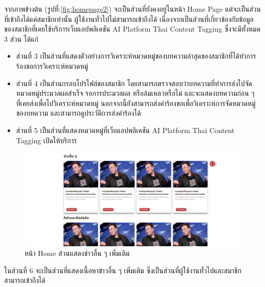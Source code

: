 \documentclass[12pt,oneside,openright,a4paper]{cpe-thai-project}
\begin{document}
\hspace*{1cm}จากภาพข้างต้น (รูปที่:\ref{fig:homepage2}) จะเป็นส่วนที่ยังคงอยู่ในหน้า Home Page แต่จะเป็นส่วนที่เข้าถึงได้แค่สมาชิกเท่านั้น ผู้ใช้งานทั่วไปไม่สามารถเข้าถึงได้
เนื่องจากเป็นส่วนที่เกี่ยวข้องกับข้อมูลของสมาชิกที่เคยใช้บริการเว็บแอปพลิเคชัน AI Platform Thai Content Tagging ซึ่งจะมีทั้งหมด 3 ส่วน ได้แก่
\begin{itemize}
  \item ส่วนที่ 3 เป็นส่วนที่แสดงตัวอย่างการวิเคราะห์หมวดหมู่ของบทความล่าสุดของสมาชิกที่ได้ทำการร้องขอการวิเคราะห์หมวดหมู่ 
  \item ส่วนที่ 4 เป็นส่วนกรอบโปรไฟล์ของสมาชิก โดยสามารถตรวจสอบว่าบทความที่ทำการส่งไปจัดหมวดหมู่ประมวลผลสำเร็จ รอการประมวลผล หรือล้มเหลวหรือไม่ 
  และจะแสดงบทความก่อน ๆ ที่เคยส่งเพื่อไปวิเคราะห์หมวดหมู่ นอกจากนี้ยังสามารถส่งคำร้องขอเพื่อวิเคราะห์การจัดหมวดหมู่ของบทความ
  และสามารถดูประวัติการส่งคำร้องได้
  \item ส่วนที่ 5 เป็นส่วนที่แสดงหมวดหมู่ที่เว็บแอปพลิเคชัน AI Platform Thai Content Tagging เปิดให้บริการ
\end{itemize}
\begin{figure}[!ht]\centering
  \includegraphics[width=14cm]{./img/project_ui/other_new.png} 
  \caption{หน้า Home ส่วนแสดงข่าวอื่น ๆ เพิ่มเติม}\label{fig:other_new} 
\end{figure}
\hspace*{1cm}ในส่วนที่ 6 จะเป็นส่วนที่แสดงเนื้อหาข่าวอื่น ๆ เพิ่มเติม ซึ่งเป็นส่วนที่ผู้ใช้งานทั่วไปและสมาชิกสามารถเข้าถึงได้ \newpage
\end{document}
